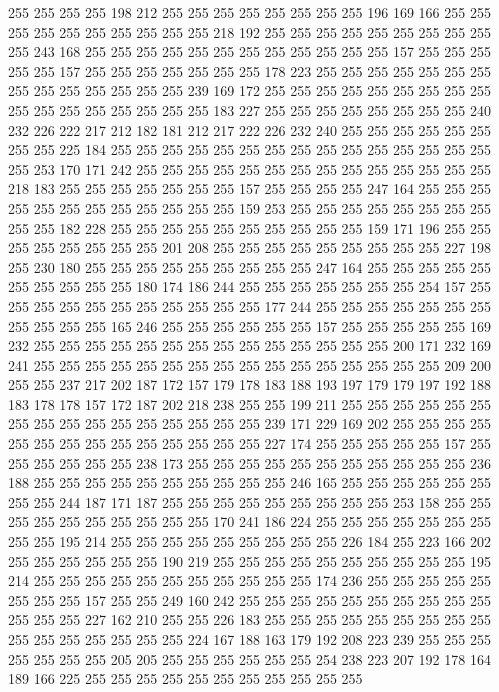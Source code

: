 255 255 255 255 198 212 255 255 255 255 255 255 255 255 196 169 166 255 255 255
255 255 255 255 255 255 255 218 192 255 255 255 255 255 255 255 255 255 255 243
168 255 255 255 255 255 255 255 255 255 255 255 255 157 255 255 255 255 255 157
255 255 255 255 255 255 255 178 223 255 255 255 255 255 255 255 255 255 255 255
255 255 255 239 169 172 255 255 255 255 255 255 255 255 255 255 255 255 255 255
255 255 255 183 227 255 255 255 255 255 255 255 255 240 232 226 222 217 212 182
181 212 217 222 226 232 240 255 255 255 255 255 255 255 255 225 184 255 255 255
255 255 255 255 255 255 255 255 255 255 255 255 255 253 170 171 242 255 255 255
255 255 255 255 255 255 255 255 255 255 255 218 183 255 255 255 255 255 255 255
157 255 255 255 255 247 164 255 255 255 255 255 255 255 255 255 255 255 255 159
253 255 255 255 255 255 255 255 255 255 255 182 228 255 255 255 255 255 255 255
255 255 255 159 171 196 255 255 255 255 255 255 255 255 201 208 255 255 255 255
255 255 255 255 255 227 198 255 230 180 255 255 255 255 255 255 255 255 255 247
164 255 255 255 255 255 255 255 255 255 255 180 174 186 244 255 255 255 255 255
255 255 254 157 255 255 255 255 255 255 255 255 255 255 255 177 244 255 255 255
255 255 255 255 255 255 255 255 165 246 255 255 255 255 255 255 157 255 255 255
255 255 169 232 255 255 255 255 255 255 255 255 255 255 255 255 255 255 200 171
232 169 241 255 255 255 255 255 255 255 255 255 255 255 255 255 255 255 255 209
200 255 255 237 217 202 187 172 157 179 178 183 188 193 197 179 179 197 192 188
183 178 178 157 172 187 202 218 238 255 255 199 211 255 255 255 255 255 255 255
255 255 255 255 255 255 255 255 255 239 171 229 169 202 255 255 255 255 255 255
255 255 255 255 255 255 255 255 227 174 255 255 255 255 255 157 255 255 255 255
255 255 238 173 255 255 255 255 255 255 255 255 255 255 255 236 188 255 255 255
255 255 255 255 255 255 255 246 165 255 255 255 255 255 255 255 255 244 187 171
187 255 255 255 255 255 255 255 255 255 253 158 255 255 255 255 255 255 255 255
255 255 170 241 186 224 255 255 255 255 255 255 255 255 255 195 214 255 255 255
255 255 255 255 255 255 226 184 255 223 166 202 255 255 255 255 255 255 190 219
255 255 255 255 255 255 255 255 255 255 195 214 255 255 255 255 255 255 255 255
255 255 255 174 236 255 255 255 255 255 255 255 255 157 255 255 249 160 242 255
255 255 255 255 255 255 255 255 255 255 255 255 227 162 210 255 255 226 183 255
255 255 255 255 255 255 255 255 255 255 255 255 255 255 255 224 167 188 163 179
192 208 223 239 255 255 255 255 255 255 255 205 205 255 255 255 255 255 255 254
238 223 207 192 178 164 189 166 225 255 255 255 255 255 255 255 255 255 255 255
